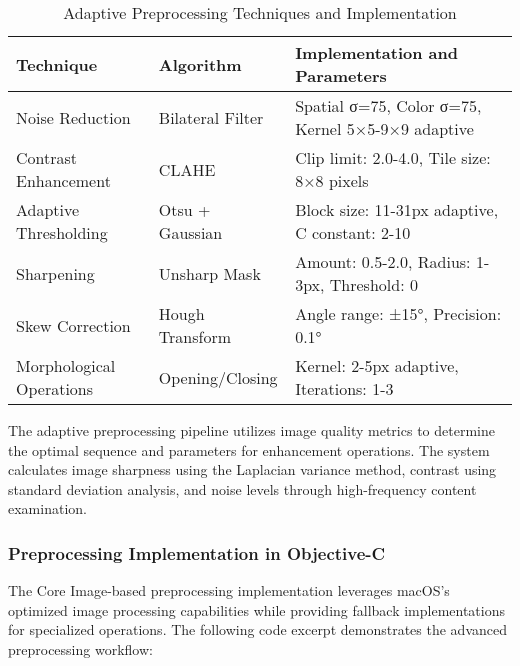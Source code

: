 \begin{table}[H]
\centering
\caption{Adaptive Preprocessing Techniques and Implementation}
\label{tab:preprocessing_adaptive}
\begin{tabular}{|p{3cm}|p{2.8cm}|p{7.2cm}|}
\hline
\textbf{Technique} & \textbf{Algorithm} & \textbf{Implementation and Parameters} \\
\hline
Noise Reduction & Bilateral Filter & Spatial σ=75, Color σ=75, Kernel 5×5-9×9 adaptive \\
\hline
Contrast Enhancement & CLAHE & Clip limit: 2.0-4.0, Tile size: 8×8 pixels \\
\hline
Adaptive Thresholding & Otsu + Gaussian & Block size: 11-31px adaptive, C constant: 2-10 \\
\hline
Sharpening & Unsharp Mask & Amount: 0.5-2.0, Radius: 1-3px, Threshold: 0 \\
\hline
Skew Correction & Hough Transform & Angle range: ±15°, Precision: 0.1° \\
\hline
Morphological Operations & Opening/Closing & Kernel: 2-5px adaptive, Iterations: 1-3 \\
\hline
\end{tabular}
\end{table}

The adaptive preprocessing pipeline utilizes image quality metrics to determine the optimal sequence and parameters for enhancement operations. The system calculates image sharpness using the Laplacian variance method, contrast using standard deviation analysis, and noise levels through high-frequency content examination.

\subsubsection{Preprocessing Implementation in Objective-C}

The Core Image-based preprocessing implementation leverages macOS's optimized image processing capabilities while providing fallback implementations for specialized operations. The following code excerpt demonstrates the advanced preprocessing workflow:

